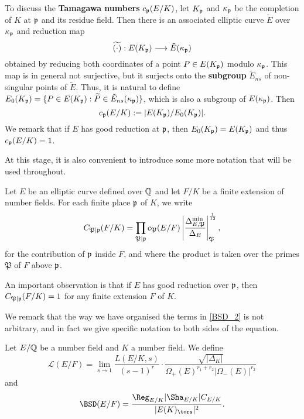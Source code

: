 \begin{enumerate}
    To discuss the \textbf{Tamagawa numbers} $c_{\mathfrak{p}}(E/K)$, let $K_{\mathfrak{p}}$ and $\kappa_{\mathfrak{p}}$ be the completion of $K$ at $\mathfrak{p}$ and its residue field. Then there is an associated elliptic curve $\tilde{E}$ over $\kappa_{\mathfrak{p}}$ and reduction map
    $$\widetilde{(\cdot)}:E(K_{\mathfrak{p}})\longrightarrow \tilde{E}(\kappa_{\mathfrak{p}})$$
    obtained by reducing both coordinates of a point $P\in E(K_{\mathfrak{p}})$ modulo $\kappa_{\mathfrak{p}}$. This map is in general not surjective, but it surjects onto the \textbf{subgroup} $\tilde{E}_{ns}$ of non-singular points of $\tilde{E}$. Thus, it is natural to define $E_0(K_{\mathfrak{p}})=\{P\in E(K_{\mathfrak{p}}):\widetilde{P}\in \tilde{E}_{ns}(\kappa_{\mathfrak{p}})\}$, which is also a subgroup of $E(\kappa_{\mathfrak{p}})$. Then 
    $$c_{\mathfrak{p}}(E/K):=|E(K_{\mathfrak{p}})/E_0(K_{\mathfrak{p}})|.$$
    We remark that if $E$ has good reduction at $\mathfrak{p}$, then $E_0(K_{\mathfrak{p}})=E(K_{\mathfrak{p}})$ and thus $c_{\mathfrak{p}}(E/K)=1$.
\end{enumerate}

At this stage, it is also convenient to introduce some more notation that will be used throughout. 

\begin{notation}\label{not_contr}
    Let $E$ be an elliptic curve defined over $\mathbb{Q}$ and let $F/K$ be a finite extension of number fields. For each finite place $\mathfrak{p}$ of $K$, we write  
    $$C_{\mathfrak{P}\mid \mathfrak{p}}(F/K)=\prod_{\mathfrak{P}\mid \mathfrak{p}}c_\mathfrak{P}(E/F)\left|\frac{\Delta_{E,\mathfrak{P}}^{\min}}{\Delta_E}\right|_\mathfrak{P}^{\frac{1}{12}},$$
    for the contribution of $\mathfrak{p}$ inside $F$, and
    where the product is taken over the primes $\mathfrak{P}$ of $F$ above $\mathfrak{p}$.
\end{notation}

An important observation is that if $E$ has good reduction over $\mathfrak{p}$, then $C_{\mathfrak{P}\mid\mathfrak{p}}(F/K)=1$ for any finite extension $F$ of $K$. 

We remark that the way we have organised the terms in \eqref{BSD_2} is not arbitrary, and in fact we give specific notation to both sides of the equation. 

\begin{notation}
    Let $E/\mathbb{Q}$ be a number field and $K$ a number field. We define 
    $$\mathcal{L}(E/F)=\lim_{s\to1}\frac{L(E/K,s)}{(s-1)^r}\cdot\frac{\sqrt{|\Delta_K|}}{\Omega_+(E)^{r_1+r_2}|\Omega_-(E)|^{r_2}}$$
    and
    $$\BSD(E/F)=\frac{\Reg_{E/K}|\Sha_{E/K}|C_{E/K}}{|E(K)_{\tors}|^2}.$$
\end{notation}


